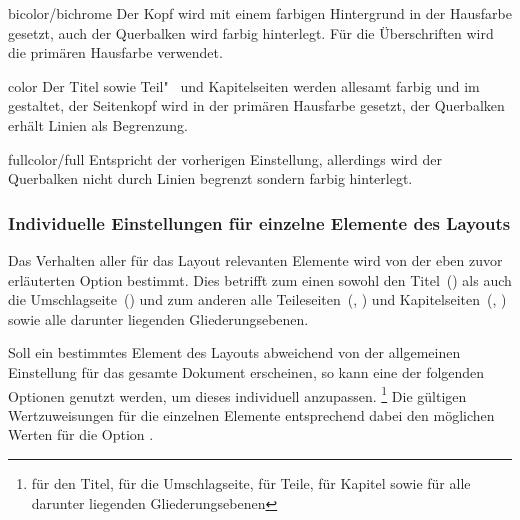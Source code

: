 \begin{Declaration*}{}
\begin{Declaration*}{}
\begin{Declaration*}{}
\begin{Declaration}
\begin{values}{}
\item[bicolor/bichrome]
   Der Kopf wird mit einem farbigen Hintergrund in der 
  Hausfarbe gesetzt, auch der Querbalken wird farbig hinterlegt. Für die 
  Überschriften wird die primären Hausfarbe verwendet.
\item[color]
  Der Titel sowie Teil"~ und Kapitelseiten werden allesamt farbig und im \CD 
  gestaltet, der Seitenkopf wird in der primären Hausfarbe  
  gesetzt, der Querbalken erhält Linien als Begrenzung.
\item[fullcolor/full]
   Entspricht der vorherigen Einstellung, allerdings wird der 
  Querbalken nicht durch Linien begrenzt sondern farbig hinterlegt.
\end{values}
\end{Declaration}


\subsubsection{Individuelle Einstellungen für einzelne Elemente des Layouts}
Das Verhalten aller für das Layout relevanten Elemente wird von der eben zuvor 
erläuterten Option  bestimmt. Dies betrifft zum einen sowohl 
den Titel~() als auch die Umschlagseite~() 
und zum anderen alle Teileseiten~(, ) und 
Kapitelseiten~(, ) sowie alle darunter liegenden 
Gliederungsebenen.

Soll ein bestimmtes Element des Layouts abweichend von der allgemeinen 
Einstellung für das gesamte Dokument erscheinen, so kann eine der folgenden 
Optionen genutzt werden, um dieses individuell anzupassen.%
\footnote{%
   für den Titel,  für die Umschlagseite,
   für Teile,  für Kapitel sowie
   für alle darunter liegenden Gliederungsebenen
} Die gültigen Wertzuweisungen für die einzelnen Elemente entsprechend dabei 
den möglichen Werten für die Option .


\end{Declaration*}
\end{Declaration*}
\end{Declaration*}
